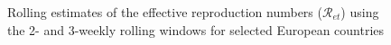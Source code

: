 \documentclass[12pt]{article}
\begin{document}
\begin{figure}[tp]%
\caption{Rolling estimates of the effective reproduction numbers ($\mathcal
{R}_{et}$) using the 2- and 3-weekly
rolling windows for selected European countries}%
\vspace{-0.2cm}%
\label{fig: Euro_Re_cmp_2W_3W}%

\begin{footnotesize}%



\end{footnotesize}
\end{figure}
\end{document}
